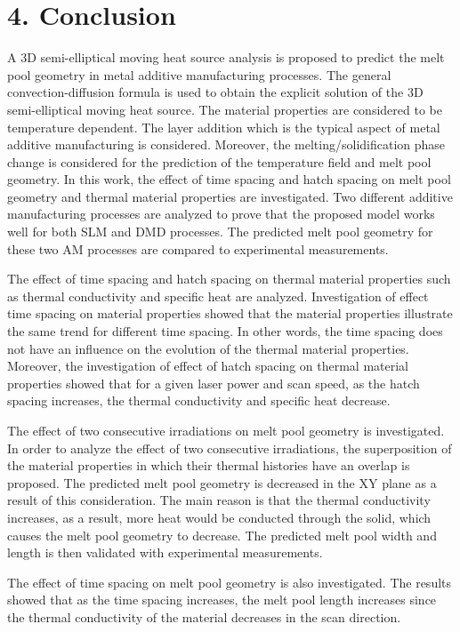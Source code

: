 \documentclass[10pt]{article}
\begin{document}
\section*{4. Conclusion}
A 3D semi-elliptical moving heat source analysis is proposed to predict the melt pool geometry in metal additive manufacturing processes. The general convection-diffusion formula is used to obtain the explicit solution of the 3D semi-elliptical moving heat source. The material properties are considered to be temperature dependent. The layer addition which is the typical aspect of metal additive manufacturing is considered. Moreover, the melting/solidification phase change is considered for the prediction of the temperature field and melt pool geometry. In this work, the effect of time spacing and hatch spacing on melt pool geometry and thermal material properties are investigated. Two different additive manufacturing processes are analyzed to prove that the proposed model works well for both SLM and DMD processes. The predicted melt pool geometry for these two AM processes are compared to experimental measurements.

The effect of time spacing and hatch spacing on thermal material properties such as thermal conductivity and specific heat are analyzed. Investigation of effect time spacing on material properties showed that the material properties illustrate the same trend for different time spacing. In other words, the time spacing does not have an influence on the evolution of the thermal material properties. Moreover, the investigation of effect of hatch spacing on thermal material properties showed that for a given laser power and scan speed, as the hatch spacing increases, the thermal conductivity and specific heat decrease.

The effect of two consecutive irradiations on melt pool geometry is investigated. In order to analyze the effect of two consecutive irradiations, the superposition of the material properties in which their thermal histories have an overlap is proposed. The predicted melt pool geometry is decreased in the XY plane as a result of this consideration. The main reason is that the thermal conductivity increases, as a result, more heat would be conducted through the solid, which causes the melt pool geometry to decrease. The predicted melt pool width and length is then validated with experimental measurements.

The effect of time spacing on melt pool geometry is also investigated. The results showed that as the time spacing increases, the melt pool length increases since the thermal conductivity of the material decreases in the scan direction.
\end{document}
